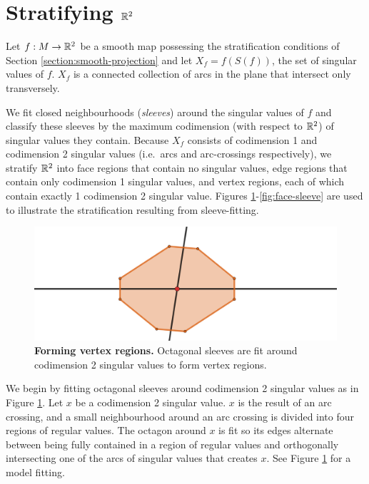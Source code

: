 \section{Stratifying $\mathbb{R}^2$}
\label{section:smooth-decompose}

Let $f:M\to\mathbb{R}^2$ be a smooth map possessing the stratification conditions of Section \ref{section:smooth-projection} and let $X_f = f(S(f))$, the set of singular values of $f$.
$X_f$ is a connected collection of arcs in the plane that intersect only transversely.

We fit closed neighbourhoods (\emph{sleeves}) around the singular values of $f$ and classify these sleeves by the maximum codimension (with respect to $\mathbb{R}^2$) of singular values they contain.
Because $X_f$ consists of codimension 1 and codimension 2 singular values (i.e.\ arcs and arc-crossings respectively), we stratify $\mathbb{R}^2$ into face regions that contain no singular values, edge regions that contain only codimension 1 singular values, and vertex regions, each of which contain exactly 1 codimension 2 singular value.
Figures \ref{fig:vertex-sleeve}-\ref{fig:face-sleeve} are used to illustrate the stratification resulting from sleeve-fitting.

\begin{figure}[h!]
	\centering
	\includegraphics[width=\textwidth]{figures/vertex-sleeve.png}
	\caption{
		\textbf{Forming vertex regions.}
		Octagonal sleeves are fit around codimension 2 singular values to form vertex regions.
	}
	\label{fig:vertex-sleeve}
\end{figure}

We begin by fitting octagonal sleeves around codimension 2 singular values as in Figure \ref{fig:vertex-sleeve}.
Let $x$ be a codimension 2 singular value.
$x$ is the result of an arc crossing, and a small neighbourhood around an arc crossing is divided into four regions of regular values.
The octagon around $x$ is fit so its edges alternate between being fully contained in a region of regular values and orthogonally intersecting one of the arcs of singular values that creates $x$.
See Figure \ref{fig:vertex-sleeve} for a model fitting.

